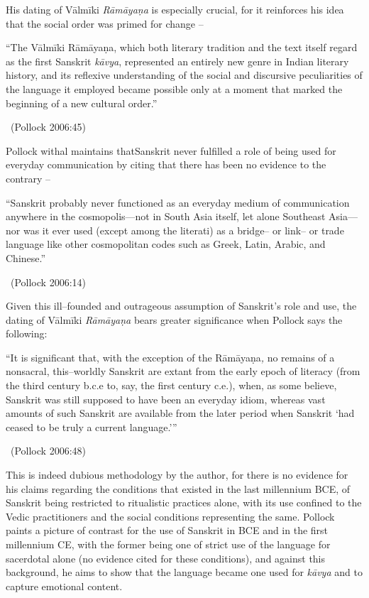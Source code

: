 His dating of Vālmīki \textit{Rāmāyaṇa} is especially crucial, for it reinforces his idea that the social order was primed for change –

\begin{myquote}
“The Vālmīki Rāmāyaṇa, which both literary tradition and the text itself regard as the first Sanskrit \textit{kāvya}, represented an entirely new genre in Indian literary history, and its reflexive understanding of the social and discursive peculiarities of the language it employed became possible only at a moment that marked the beginning of a new cultural order.” 

~\hfill (Pollock 2006:45)
\end{myquote}

Pollock withal maintains thatSanskrit never fulfilled a role of being used for everyday communication by citing that there has been no evidence to the contrary –

\begin{myquote}
“Sanskrit probably never functioned as an everyday medium of communication anywhere in the cosmopolis—not in South Asia itself, let alone Southeast Asia— nor was it ever used (except among the literati) as a bridge– or link– or trade language like other cosmopolitan codes such as Greek, Latin, Arabic, and Chinese.” 

~\hfill (Pollock 2006:14)
\end{myquote}

Given this ill–founded and outrageous assumption of Sanskrit’s role and use, the dating of Vālmīki \textit{Rāmāyaṇa} bears greater significance when Pollock says the following:

\begin{myquote}
“It is significant that, with the exception of the Rāmāyaṇa\textit{,} no remains of a nonsacral, this–worldly Sanskrit are extant from the early epoch of literacy (from the third century b.c.e to, say, the first century c.e.), when, as some believe, Sanskrit was still supposed to have been an everyday idiom, whereas vast amounts of such Sanskrit are available from the later period when Sanskrit ‘had ceased to be truly a current language.’” 

~\hfill (Pollock 2006:48)
\end{myquote}

This is indeed dubious methodology by the author, for there is no evidence for his claims regarding the conditions that existed in the last millennium BCE, of Sanskrit being restricted to ritualistic practices alone, with its use confined to the Vedic practitioners and the social conditions representing the same. Pollock paints a picture of contrast for the use of Sanskrit in BCE and in the first millennium CE, with the former being one of strict use of the language for sacerdotal alone (no evidence cited for these conditions), and against this background, he aims to show that the language became one used for \textit{kāvya} and to capture emotional content.

